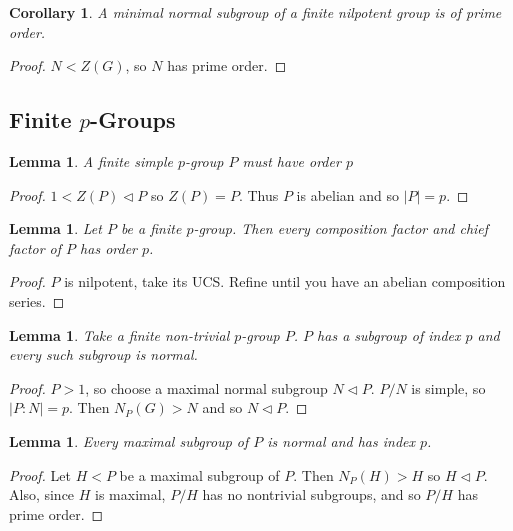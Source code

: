 \documentclass[a4paper,10pt]{article}
\newtheorem{Cor}[thm]{Corollary}
\newtheorem{Lem}[thm]{Lemma}
\begin{document}
\begin{Cor}
A minimal normal subgroup of a finite nilpotent group is of prime order. 
\end{Cor}

\begin{proof}
$N < Z(G)$,  so $N$ has prime order.
\end{proof}



\subsection{Finite $p$-Groups}

\begin{Lem}
A finite simple $p$-group $P$ must have order $p$
\end{Lem}

\begin{proof}
$1 < Z(P) \triangleleft P$ so $Z(P) = P$. Thus $P$ is abelian and so $|P| = p$.
\end{proof}

\begin{Lem}
Let $P$ be a finite $p$-group. Then every composition factor and chief factor of $P$ has order $p$. 
\end{Lem}

\begin{proof}
$P$ is nilpotent, take its UCS. Refine until you have an abelian composition series. 
\end{proof}

\begin{Lem}
Take a finite non-trivial $p$-group $P$. $P$ has a subgroup of index $p$ and every such subgroup is normal.
\end{Lem}

\begin{proof}
$P > 1$, so choose a maximal normal subgroup $N \triangleleft P$. $P / N$ is simple, so $|P : N| = p$. Then $N_P(G) > N$ and so $N \triangleleft P$. 
\end{proof}


\begin{Lem}
Every maximal subgroup of $P$ is normal and has index $p$.
\end{Lem}

\begin{proof}
Let $H < P$ be a maximal subgroup of $P$. Then $N_P(H) > H$ so $H \triangleleft P$. Also, since $H$ is maximal, $P / H$ has no nontrivial subgroups, and so $P / H$ has prime order. 
\end{proof}
\end{document}
